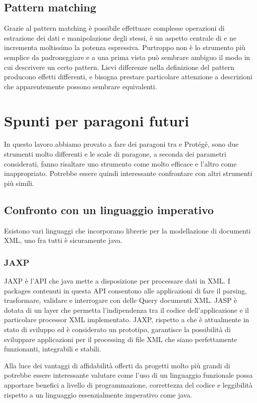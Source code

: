 \subsection{Pattern matching}
Grazie al pattern matching è possibile effettuare complesse operazioni di estrazione dei dati e manipolazione degli stessi, è un aspetto centrale di \cduce e ne incrementa moltissimo la potenza espressiva. Purtroppo non è lo strumento più semplice da padroneggiare e a una prima vista può sembrare ambiguo il modo in cui descrivere un certo pattern. Lievi differenze nella definizione del pattern producono effetti differenti, e bisogna prestare particolare attenzione a descrizioni che apparentemente possono sembrare equivalenti.
\section{Spunti per paragoni futuri}
In questo lavoro abbiamo provato a fare dei paragoni tra \cduce e Protégé, sono due strumenti molto differenti e le scale di paragone, a seconda dei parametri considerati, fanno risaltare uno strumento come molto efficace e l'altro come inappropriato. Potrebbe essere quindi interessante confrontare \cduce con altri strumenti più simili.
\subsection{Confronto con un linguaggio imperativo}
Esistono vari linguaggi che incorporano librerie per la modellazione di documenti XML, uno fra tutti è sicuramente java.
\subsubsection{JAXP}
JAXP\cite{JAXP} è l'API che java mette a disposizione per processare dati in XML. I packages contenuti in questa API consentono alle applicazioni di fare il parsing, trasformare, validare e interrogare con delle Query documenti XML. JASP è dotata di un layer che permetta l'indipendenza tra il codice dell'applicazione e il particolare processor XML implementato. JAXP, rispetto a \cduce che è attualmente in stato di sviluppo ed è considerato un prototipo, garantisce la possibilità di sviluppare applicazioni per il processing di file XML che siano perfettamente funzionanti, integrabili e stabili.

Alla luce dei vantaggi di affidabilità offerti da progetti molto più grandi di \cduce potrebbe essere interessante valutare come l'uso di un linguaggio funzionale possa apportare benefici a livello di programmazione, correttezza del codice e leggibilità rispetto a un linguaggio essenzialmente imperativo come java.
